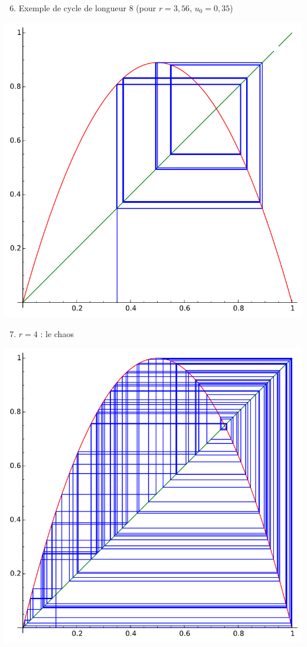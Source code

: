 \begin{frame}
\begin{enumerate}
  \setcounter{enumi}{5}
  \item Exemple de cycle de longueur $8$ (pour $r=3,56$, $u_0=0,35$)
 \end{enumerate} 
   \begin{center}
   \includegraphics[scale=0.5]{figures/chaos10}  
   \end{center}

 \end{frame}



\begin{frame} 
\begin{enumerate}
\setcounter{enumi}{6}
  \item $r=4$ : le chaos
  \end{enumerate} 
  \begin{center}
\includegraphics[scale=0.5]{figures/chaos4}
  \end{center}



\end{frame}



